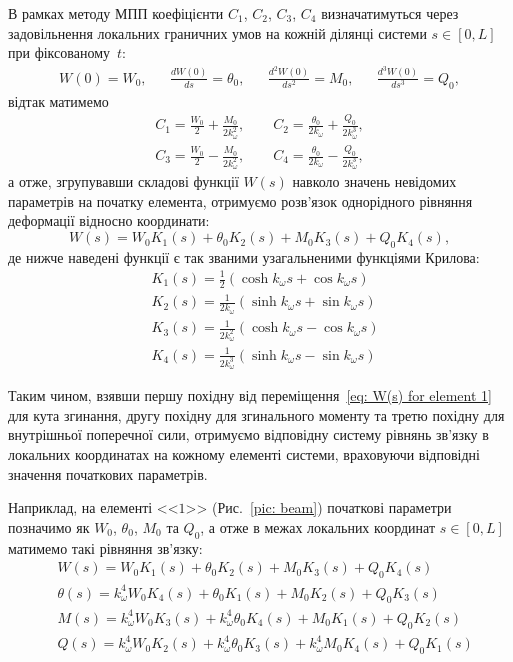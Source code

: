 \documentclass{mathreport}
\begin{document}
В рамках методу МПП коефіцієнти $C_1$, $C_2$, $C_3$, $C_4$ визначатимуться через задовільнення локальних граничних умов на кожній ділянці системи $s \in [0,L]$ при фіксованому~$t:$ 
\begin{align}\label{eq: TMM initial conditions, element 1}
    W(0)=W_0, && \frac{dW(0)}{ds}=\theta_0, && \frac{d^2W(0)}{ds^2}=M_0, && \frac{d^3W(0)}{ds^3}=Q_0,
\end{align}
відтак матимемо
\begin{align}\label{eq: A1, A2, A3, A4 for element 1}
    C_1=\frac{W_0}{2} + \frac{M_0}{2k_{\omega}^2}, 
    \qquad C_2=\frac{\theta_0}{2k_{\omega}} + \frac{Q_0}{2k_{\omega}^3}, \\
    C_3=\frac{W_0}{2} - \frac{M_0}{2k_{\omega}^2},
    \qquad C_4=\frac{\theta_0}{2k_{\omega}} - \frac{Q_0}{2k_{\omega}^3},
\end{align}
а отже, згрупувавши складові функції $W(s)$ навколо значень невідомих параметрів на початку елемента, отримуємо розв'язок однорідного рівняння деформації відносно координати:
\begin{equation}\label{eq: W(s) for element 1}
    W(s) = W_0 K_1(s) + \theta_0 K_2(s) + M_0 K_3(s) + Q_0 K_4(s),
\end{equation}
де нижче наведені функції є так званими узагальненими функціями Крилова:
\begin{align}\label{eq: Krylov for element 1}
    & K_1(s) = \tfrac{1}{2} (\cosh{k_{\omega} s} + \cos{k_{\omega} s}) \\
    & K_2(s) = \tfrac{1}{2k_{\omega}} (\sinh{k_{\omega} s} + \sin{k_{\omega} s}) \\
    & K_3(s) = \tfrac{1}{2k_{\omega}^2} (\cosh{k_{\omega} s} - \cos{k_{\omega} s}) \\
    & K_4(s) = \tfrac{1}{2k_{\omega}^3} (\sinh{k_{\omega} s} - \sin{k_{\omega} s})
\end{align}

Таким чином, взявши першу похідну від переміщення~\eqref{eq: W(s) for element 1} для кута згинання, другу похідну для згинального моменту та третю похідну для внутрішньої поперечної сили, отримуємо відповідну систему рівнянь зв'язку в локальних координатах на кожному елементі системи, враховуючи відповідні значення початкових параметрів.

Наприклад, на елементі <<$1$>> (Рис.~\ref{pic: beam}) початкові параметри позначимо як $W_0$, $\theta_0$, $M_0$ та $Q_0$, а отже в межах локальних координат $s \in [0,L]$ матимемо такі рівняння зв'язку:
\begin{align}\label{eq: field equations for element 1}
    & W(s) = W_0 K_1(s) + \theta_0 K_2(s) + M_0 K_3(s) + Q_0 K_4(s) \\
    & \theta(s) = k_{\omega}^4 W_0 K_4(s) + \theta_0 K_1(s) + M_0 K_2(s) + Q_0 K_3(s) \\
    & M(s) = k_{\omega}^4 W_0 K_3(s) + k_{\omega}^4 \theta_0 K_4(s) + M_0 K_1(s) + Q_0 K_2(s) \\
    & Q(s) = k_{\omega}^4 W_0 K_2(s) + k_{\omega}^4 \theta_0 K_3(s) + k_{\omega}^4 M_0 K_4(s) + Q_0 K_1(s)
\end{align}
\end{document}
